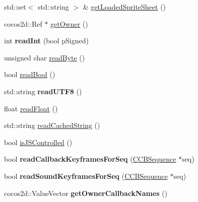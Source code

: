 \begin{DoxyCompactItemize}
\item 
std\+::set$<$ std\+::string $>$ \& \hyperlink{classcocosbuilder_1_1CCBReader_adf8ae8ca90d8e95c28b327f3077e5535}{get\+Loaded\+Sprite\+Sheet} ()
\item 
cocos2d\+::\+Ref $\ast$ \hyperlink{classcocosbuilder_1_1CCBReader_a7772e63a2e45e8aea5d894a9a2dad1c6}{get\+Owner} ()
\item 
\mbox{\label{classcocosbuilder_1_1CCBReader_a5ed99bb90a5a868a970404b826049e74}} 
int {\bfseries read\+Int} (bool p\+Signed)
\item 
unsigned char \hyperlink{classcocosbuilder_1_1CCBReader_abe30f2edc0c4ba199aaa0cde85b07cd7}{read\+Byte} ()
\item 
bool \hyperlink{classcocosbuilder_1_1CCBReader_ab343ee1b1aafa4ce9b223563cb0b1db2}{read\+Bool} ()
\item 
\mbox{\label{classcocosbuilder_1_1CCBReader_a7b7e7ae85e89f660aa5301dd33433dec}} 
std\+::string {\bfseries read\+U\+T\+F8} ()
\item 
float \hyperlink{classcocosbuilder_1_1CCBReader_a6e205e174b2173124e27a8ef19ca283d}{read\+Float} ()
\item 
std\+::string \hyperlink{classcocosbuilder_1_1CCBReader_a076e51bafdbf461ecec8a5ccdcc496ab}{read\+Cached\+String} ()
\item 
bool \hyperlink{classcocosbuilder_1_1CCBReader_a85bbde9fd4b13809ac5b1cd259ea2145}{is\+J\+S\+Controlled} ()
\item 
\mbox{\label{classcocosbuilder_1_1CCBReader_a3616ec613bf56919777fe31214c5d5f1}} 
bool {\bfseries read\+Callback\+Keyframes\+For\+Seq} (\hyperlink{classcocosbuilder_1_1CCBSequence}{C\+C\+B\+Sequence} $\ast$seq)
\item 
\mbox{\label{classcocosbuilder_1_1CCBReader_a06d19bf2c9f55e9a73afdf2d0f2a2ee2}} 
bool {\bfseries read\+Sound\+Keyframes\+For\+Seq} (\hyperlink{classcocosbuilder_1_1CCBSequence}{C\+C\+B\+Sequence} $\ast$seq)
\item 
\mbox{\label{classcocosbuilder_1_1CCBReader_a5df103b71082c9643ef83e43eeb0a215}} 
cocos2d\+::\+Value\+Vector {\bfseries get\+Owner\+Callback\+Names} ()
\item 

\end{DoxyCompactItemize}
